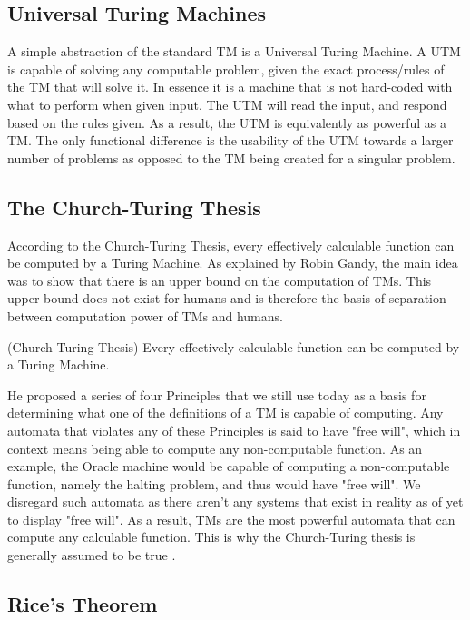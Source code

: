 \subsection{Universal Turing Machines}\label{subsec:UTM}

A simple abstraction of the standard TM is a Universal Turing Machine. A UTM is capable of solving any computable problem, given the exact process/rules of the TM that will solve it.
In essence it is a machine that is not hard-coded with what to perform when given input.
The UTM will read the input, and respond based on the rules given.
As a result, the UTM is equivalently as powerful as a TM.
The only functional difference is the usability of the UTM towards a larger number of problems as opposed to the TM being created for a singular problem.

\subsection{The Church-Turing Thesis}\label{subsec:Church-Turing Thesis}

According to the Church-Turing Thesis, every effectively calculable function can be computed by a Turing Machine.
As explained by Robin Gandy, the main idea was to show that there is an upper bound on the computation of TMs.
This upper bound does not exist for humans and is therefore the basis of separation between computation power of TMs and humans.

\begin{thm}
    \label{thm:CTT}
    (Church-Turing Thesis) Every effectively calculable function can be computed by a Turing Machine.
\end{thm}

He proposed a series of four Principles that we still use today as a basis for determining what one of the definitions of a TM is capable of computing.
Any automata that violates any of these Principles is said to have "free will", which in context means being able to compute any non-computable function.
As an example, the Oracle machine would be capable of computing a non-computable function, namely the halting problem, and thus would have "free will".
We disregard such automata as there aren't any systems that exist in reality as of yet to display "free will".
As a result, TMs are the most powerful automata that can compute any calculable function.
This is why the Church-Turing thesis is generally assumed to be true \cite{GandyPaper}.

\subsection{Rice's Theorem}\label{subsec:RiceThm}

